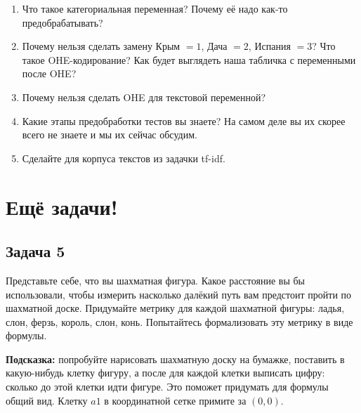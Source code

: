 \documentclass[12pt, a4paper, oneside]{article}
\begin{document}
\begin{enumerate} 
	\item  Что такое категориальная переменная? Почему её надо как-то предобрабатывать? 
	\item  Почему нельзя сделать замену Крым $=1$, Дача $=2$, Испания $=3$? Что такое OHE-кодирование? Как будет выглядеть наша табличка с переменными после OHE?
	\item  Почему нельзя сделать OHE для текстовой переменной?
	\item  Какие этапы предобработки тестов вы знаете? На самом деле вы их скорее всего не знаете и мы их сейчас обсудим. 
	\item Сделайте для корпуса текстов из задачки tf-idf. 
\end{enumerate}


\section*{Ещё задачи!}

\subsection*{Задача 5} 

Представьте себе, что вы шахматная фигура. Какое расстояние вы бы использовали, чтобы измерить насколько далёкий путь вам предстоит пройти по шахматной доске.  Придумайте метрику для каждой шахматной фигуры: ладья, слон, ферзь, король, слон, конь. Попытайтесь формализовать эту метрику в виде формулы. 

\textbf{Подсказка:}  попробуйте нарисовать шахматную доску на бумажке, поставить в какую-нибудь клетку фигуру, а после для каждой клетки выписать цифру: сколько до этой клетки идти фигуре.  Это поможет придумать для формулы общий вид. Клетку $a1$ в координатной сетке примите за $(0,0)$. 
\end{document}
